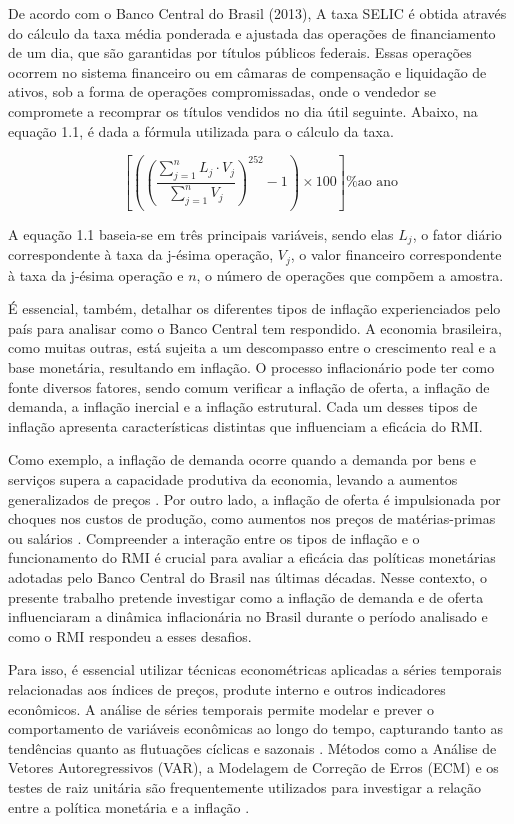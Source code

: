 \documentclass[12pt,oneside,a4paper,chapter=TITLE,english,brazil,sumario=abnt-6027-2012]{abntex2}
\begin{document}
De acordo com o Banco Central do Brasil (2013), A taxa SELIC é obtida através do cálculo da taxa média ponderada e ajustada das operações de financiamento de um dia, que são garantidas por títulos públicos federais. Essas operações ocorrem no sistema financeiro ou em câmaras de compensação e liquidação de ativos, sob a forma de operações compromissadas, onde o vendedor se compromete a recomprar os títulos vendidos no dia útil seguinte. Abaixo, na equação 1.1, é dada a fórmula utilizada para o cálculo da taxa.

\begin{equation}
	\left[ \left( \left(\frac{\sum_{j=1}^{n} L_j \cdot V_j}{\sum_{j=1}^{n} V_j} \right)^{252} - 1 \right) \times 100 \right] \textrm{\% ao ano}
\end{equation}


A equação 1.1 baseia-se em três principais variáveis, sendo elas $L_j$, o fator diário correspondente à taxa da j-ésima operação, $V_j$, o valor financeiro correspondente à taxa da j-ésima operação e $n$, o número de operações que compõem a amostra.

É essencial, também, detalhar os diferentes tipos de inflação experienciados pelo país para analisar como o Banco Central tem respondido. A economia brasileira, como muitas outras, está sujeita a um descompasso entre o crescimento real e a base monetária, resultando em inflação. O processo inflacionário pode ter como fonte diversos fatores, sendo comum verificar a inflação de oferta, a inflação de demanda, a inflação inercial e a inflação estrutural. Cada um desses tipos de inflação apresenta características distintas que influenciam a eficácia do RMI.

Como exemplo, a inflação de demanda ocorre quando a demanda por bens e serviços supera a capacidade produtiva da economia, levando a aumentos generalizados de preços \cite{olivierblanchard_2013_macroeconomics}. Por outro lado, a inflação de oferta é impulsionada por choques nos custos de produção, como aumentos nos preços de matérias-primas ou salários \cite{blinder_2008_the}. Compreender a interação entre os tipos de inflação e o funcionamento do RMI é crucial para avaliar a eficácia das políticas monetárias adotadas pelo Banco Central do Brasil nas últimas décadas. Nesse contexto, o presente trabalho pretende investigar como a inflação de demanda e de oferta influenciaram a dinâmica inflacionária no Brasil durante o período analisado e como o RMI respondeu a esses desafios.

Para isso, é essencial utilizar técnicas econométricas aplicadas a séries temporais relacionadas aos índices de preços, produte interno e outros indicadores econômicos. A análise de séries temporais permite modelar e prever o comportamento de variáveis econômicas ao longo do tempo, capturando tanto as tendências quanto as flutuações cíclicas e sazonais \cite{enders_2015_applied}. Métodos como a Análise de Vetores Autoregressivos (VAR), a Modelagem de Correção de Erros (ECM) e os testes de raiz unitária são frequentemente utilizados para investigar a relação entre a política monetária e a inflação \cite{hamilton_2020_time}.
\end{document}
